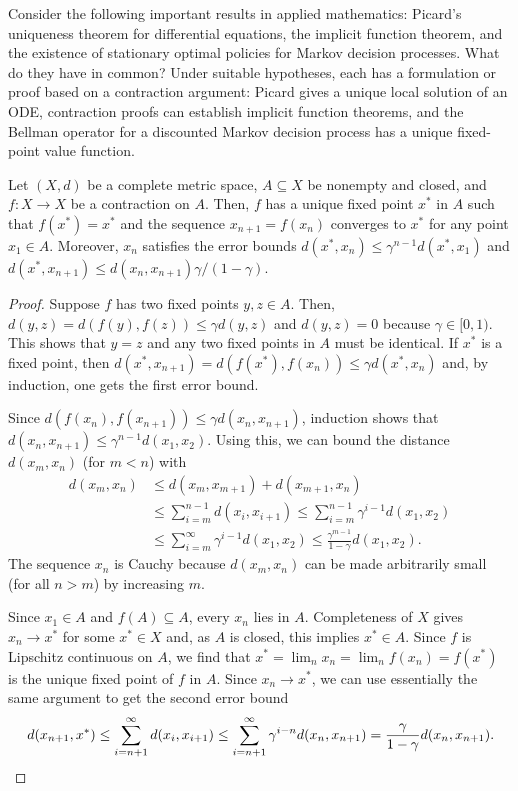 Consider the following important results in applied mathematics: Picard's uniqueness theorem for differential equations, the implicit function theorem, and the existence of stationary optimal policies for Markov decision processes.
What do they have in common?
Under suitable hypotheses, each has a formulation or proof based on a contraction argument: Picard gives a unique local solution of an ODE, contraction proofs can establish implicit function theorems, and the Bellman operator for a discounted Markov decision process has a unique fixed-point value function.

\begin{theorem}
Let $(X,d)$ be a complete metric space, $A\subseteq X$ be nonempty and closed, and $f:X\to X$ be a contraction on $A$.
Then, $f$ has a unique fixed point $x^*$ in $A$ such that $f(x^*) = x^*$ and the sequence $x_{n+1} = f(x_n)$ converges to $x^*$ for any point $x_1 \in A$.  Moreover, $x_n$ satisfies the error bounds $d(x^*,x_n) \leq \gamma^{n-1} d(x^*,x_1)$ and $d(x^*,x_{n+1}) \leq d(x_n,x_{n+1})\gamma /(1-\gamma)$.
\end{theorem}
\begin{proof}
Suppose $f$ has two fixed points $y,z\in A$.
Then, $d(y,z) = d \left(f(y),f(z) \right) \leq \gamma  d(y,z)$ and $d(y,z) = 0$ because $\gamma \in [0,1)$.
This shows that $y=z$ and any two fixed points in $A$ must be identical.
If $x^*$ is a fixed point, then $d(x^*,x_{n+1}) = d(f(x^*),f(x_{n})) \leq \gamma d(x^*,x_n)$ and, by induction, one gets the first error bound.

Since $d(f(x_n),f(x_{n+1})) \leq \gamma d(x_n,x_{n+1})$, induction shows that $d(x_n,x_{n+1}) \leq \gamma^{n-1} d(x_1,x_2)$.
Using this, we can bound the distance $d(x_m,x_n)$ (for $m<n$) with
\begin{align}
d(x_m,x_n)
& \leq d(x_m,x_{m+1}) + d(x_{m+1},x_n) \nonumber \\
& \leq \sum_{i=m}^{n-1} d(x_i,x_{i+1}) 
 \leq \sum_{i=m}^{n-1} \gamma^{i-1} d(x_1,x_2) \nonumber \\
& \leq \sum_{i=m}^\infty \gamma^{i-1} d(x_1,x_2) 
 \leq \frac{\gamma^{m-1}}{1-\gamma} d(x_1,x_2). \label{eq:contraction_error}
\end{align}
The sequence $x_n$ is Cauchy because $d(x_m,x_n)$ can be made arbitrarily small (for all $n>m$) by increasing $m$.

Since $x_1\in A$ and $f(A)\subseteq A$, every $x_n$ lies in $A$.
Completeness of $X$ gives $x_n\to x^*$ for some $x^*\in X$ and, as $A$ is closed, this implies $x^*\in A$.
Since $f$ is Lipschitz continuous on $A$, we find that $x^* = \lim_n x_n = \lim_n f(x_n) = f(x^*)$ is the unique fixed point of $f$ in $A$.
Since $x_n \to x^*$, we can use essentially the same argument to get the second error bound
\[  d(x_{n+1},x^*) \leq \sum_{i=n+1}^{\infty} d(x_i,x_{i+1}) 
 \leq \sum_{i=n+1}^{\infty} \gamma^{i-n} d(x_n,x_{n+1}) = \frac{\gamma}{1-\gamma} d(x_n,x_{n+1}).\!  \qedhere \]
\end{proof}

